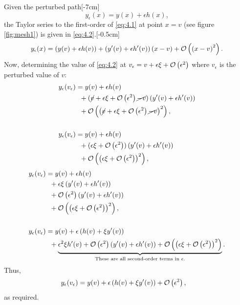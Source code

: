 Given the perturbed path[-7cm]%
\begin{equation}
	\label{eq:4.1}
	y_\epsilon(x) = y(x) + \epsilon h(x),
\end{equation}
the Taylor series to the first-order of \eqref{eq:4.1} at point $x=v$ (see figure \ref{fig:mesh1}) is given in \eqref{eq:4.2}.[-0.5cm]
\begin{equation}
\begin{split}
\label{eq:4.2}
y_\epsilon(x)=\left(y(v) + \epsilon h(v)\right) + \left(y^\prime(v) + \epsilon h^\prime(v)\right)(x - v) + \mathcal{O}\left(\left(x -v\right)^2\right).
\end{split}
\end{equation}
Now, determining the value of \eqref{eq:4.2} at $v_\epsilon = v + \epsilon \xi + \mathcal{O}\left(\epsilon^2\right)$ where $v_\epsilon$ is the perturbed value of $v$:
\begin{equation*}
\begin{split}
y_\epsilon(v_\epsilon)&= y(v) + \epsilon h(v)\\ 
&\;\;+ (\cancel{v} + \epsilon \xi + \mathcal{O}\left(\epsilon^2\right)\cancel{-v})\left(y^\prime(v) +\epsilon h^\prime(v)\right)\\ 
&\;\;+ \mathcal{O}\left(\left(\cancel{v} + \epsilon \xi + \mathcal{O}\left(\epsilon^2\right)\cancel{-v}\right)^2\right),\\\\
y_\epsilon(v_\epsilon)&= y(v) + \epsilon h(v)\\
&\;\;+ (\epsilon \xi + \mathcal{O}\left(\epsilon^2\right))\left(y^\prime(v) +\epsilon h^\prime(v)\right)\\
&\;\;+ \mathcal{O}\left(\left(\epsilon \xi + \mathcal{O}\left(\epsilon^2\right)\right)^2\right),
\end{split}
\end{equation*}
\begin{equation*}
\begin{split}
y_\epsilon(v_\epsilon)&= y(v) + \epsilon h(v)\\
&\;\;+ \epsilon\xi\left(y^\prime(v) +\epsilon h^\prime(v)\right)\\
&\;\;+ \mathcal{O}\left(\epsilon^2\right)\left(y^\prime(v) +\epsilon h^\prime(v)\right)\\
&\;\;+ \mathcal{O}\left(\left(\epsilon \xi + \mathcal{O}\left(\epsilon^2\right)\right)^2\right),\\\\
y_\epsilon(v_\epsilon)&=y(v) + \epsilon \left(h(v) + \xi y^\prime(v)\right)\\
&\;\;+ \underbrace{\epsilon^2\xi h^\prime(v)
+ \mathcal{O} \left(\epsilon^2\right)\left(y^\prime(v) +\epsilon h^\prime(v)\right)+ \mathcal{O}\left(\left(\epsilon \xi + \mathcal{O}\left(\epsilon^2\right)\right)^2\right)}_\text{These are all second-order terms in $\epsilon$.}.
\end{split}
\end{equation*}
Thus,
\begin{equation}
\label{eq:4.3}
\begin{split}
y_\epsilon(v_\epsilon)&=y(v) + \epsilon \left(h(v) + \xi y^\prime(v)\right) + \mathcal{O}\left(\epsilon^2\right),
\end{split}
\end{equation}
as required.

